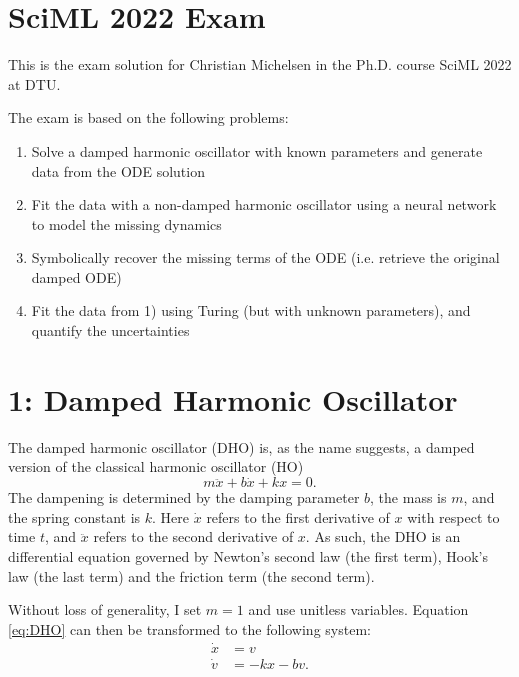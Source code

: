 \documentclass[10pt,a4paper]{article}
\begin{document}
\section*{SciML 2022 Exam}

This is the exam solution for Christian Michelsen in the Ph.D. course SciML 2022 at DTU.

\vspace{1cm}

\noindent The exam is based on the following problems:
\begin{enumerate}
    \item Solve a damped harmonic oscillator with known parameters and generate data from the ODE solution
    \item Fit the data with a non-damped harmonic oscillator using a neural network to model the missing dynamics
    \item Symbolically recover the missing terms of the ODE (i.e. retrieve the original damped ODE)
    \item Fit the data from 1) using Turing (but with unknown parameters), and quantify the uncertainties
\end{enumerate}

\clearpage
\section*{1: Damped Harmonic Oscillator}

The damped harmonic oscillator (DHO) is, as the name suggests, a damped version of the classical harmonic oscillator (HO)
\begin{equation}
    m \ddot{x} + b\dot{x} + kx = 0.
    \label{eq:DHO}
\end{equation}
The dampening is determined by the damping parameter $b$, the mass is $m$, and the spring constant is $k$.
Here $\dot{x}$ refers to the first derivative of $x$ with respect to time $t$, and $\ddot{x}$ refers to the second derivative of $x$.
As such, the DHO is an differential equation governed by Newton's second law (the first term),
Hook's law (the last term) and the friction term (the second term).

Without loss of generality, I set $m=1$ and use unitless variables.
Equation \eqref{eq:DHO} can then be transformed to the following system:
\begin{equation}
    \begin{split}
        \dot{x} &= v \\
        \dot{v} &= -kx - bv.
    \end{split}
    \label{eq:DHO_2D}
\end{equation}
\end{document}
